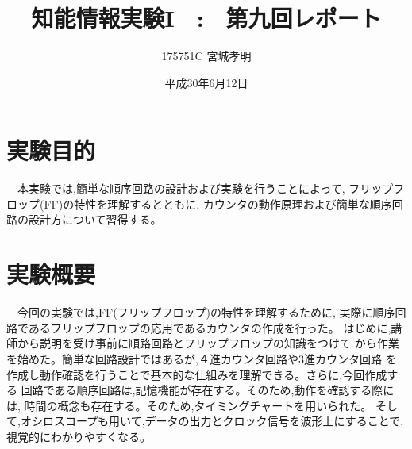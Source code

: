 \documentclass[a4paper,11pt,titlepage]{jarticle}
\title{知能情報実験I　:　第九回レポート}
\author{175751C 宮城孝明}
\date{平成30年6月12日}
\begin{document}
\maketitle
\tableofcontents
\clearpage
\section{実験目的}
　本実験では,簡単な順序回路の設計および実験を行うことによって,
フリップフロップ(FF)の特性を理解するとともに,
カウンタの動作原理および簡単な順序回路の設計方について習得する。
\section{実験概要}
　今回の実験では,FF(フリップフロップ)の特性を理解するために,
実際に順序回路であるフリップフロップの応用であるカウンタの作成を行った。
はじめに,講師から説明を受け事前に順路回路とフリップフロップの知識をつけて
から作業を始めた。簡単な回路設計ではあるが,４進カウンタ回路や3進カウンタ回路
を作成し動作確認を行うことで基本的な仕組みを理解できる。さらに,今回作成する
回路である順序回路は,記憶機能が存在する。そのため,動作を確認する際には,
時間の概念も存在する。そのため,タイミングチャートを用いられた。
そして,オシロスコープも用いて,データの出力とクロック信号を波形上にすることで,
視覚的にわかりやすくなる。
\end{document}
